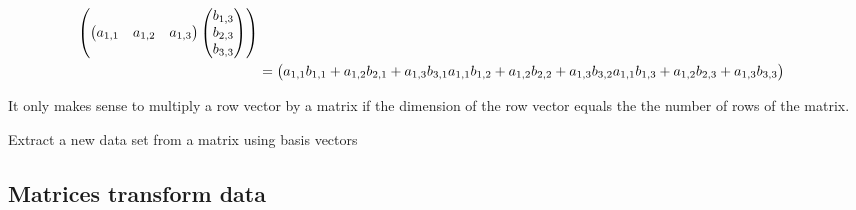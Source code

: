 \documentclass{ximera}
\begin{document}
\begin{align*}
\begin{pmatrix}
  \begin{pmatrix} a_{1,1} & a_{1,2} & a_{1,3} \end{pmatrix}\begin{pmatrix} b_{1,3} \\ b_{2,3} \\ b_{3,3} \end{pmatrix}
\end{pmatrix}\\
&=\arraycolsep=0pt
\begin{pmatrix}
a_{1,1}b_{1,1}+a_{1,2}b_{2,1}+a_{1,3}b_{3,1} &
a_{1,1}b_{1,2}+a_{1,2}b_{2,2}+a_{1,3}b_{3,2} &
a_{1,1}b_{1,3}+a_{1,2}b_{2,3}+a_{1,3}b_{3,3}
\end{pmatrix}
\end{align*}



\begin{warning}
  It only makes sense to multiply a row vector by a matrix if the
  dimension of the row vector equals the the number of rows of the
  matrix.
\end{warning}

\begin{example}
Extract a new data set from a matrix using basis vectors
\end{example}


\begin{example}
\end{example}



\subsection{Matrices transform data}
\end{document}
